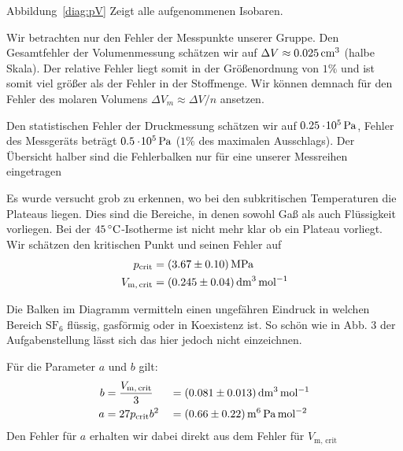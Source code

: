 Abbildung~\ref{diag:pV} Zeigt alle aufgenommenen Isobaren. 

Wir betrachten nur den Fehler der Messpunkte unserer Gruppe.
Den Gesamtfehler der Volumenmessung schätzen wir auf $\Delta V \approx \unit[0.025]{cm^3}$ (halbe Skala). Der relative Fehler liegt somit in der Größenordnung von $1\%$ und ist somit viel größer als der Fehler in der Stoffmenge. Wir können demnach für den Fehler des molaren Volumens $\Delta V_m \approx \Delta V / n$ ansetzen.

Den statistischen Fehler der Druckmessung schätzen wir auf $\unit[0.25 \e{5}]{Pa}$, Fehler des Messgeräts beträgt $\unit[0.5 \e5]{Pa}$ ($1\%$ des maximalen Ausschlags). 
Der Übersicht halber sind die Fehlerbalken nur für eine unserer Messreihen eingetragen

Es wurde versucht grob zu erkennen, wo bei den subkritischen Temperaturen die Plateaus liegen. Dies sind die Bereiche, in denen sowohl Gaß als auch Flüssigkeit vorliegen. Bei der $\unit[45]{ ^\circ C}$-Isotherme ist nicht mehr klar ob ein Plateau vorliegt. Wir schätzen den kritischen Punkt und seinen Fehler auf
\begin{align*}
    p_\mathrm{crit} &= \unit[(3.67 \pm 0.10)]{MPa} \\
    V_\mathrm{m,\, crit} &= \unit[(0.245 \pm 0.04)]{dm^3\, mol^{-1}}
\end{align*}

Die Balken im Diagramm vermitteln einen ungefähren Eindruck in welchen Bereich $\mathrm{S F_6}$ flüssig, gasförmig oder in Koexistenz ist. So schön wie in Abb. 3 der Aufgabenstellung lässt sich das hier jedoch nicht einzeichnen.

Für die Parameter $a$ und $b$ gilt:
%
\begin{alignat*}{3}
    b &= \frac{V_\mathrm{m,\, crit}}{3} &&= \unit[(0.081 \pm  0.013)]{dm^3\, mol^{-1}}\\
    a &= 27 p_\mathrm{crit} b^2 &&= \unit[(0.66 \pm 0.22)]{m^6\, Pa\, mol^{-2}}
\end{alignat*}
%
Den Fehler für $a$ erhalten wir dabei direkt aus dem Fehler für $V_\mathrm{m,\, crit}$



